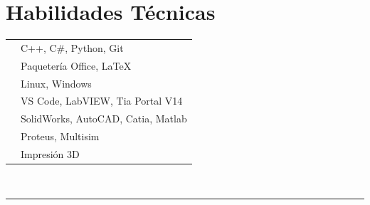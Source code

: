 \documentclass[oneside]{article}
\begin{document}
{\begin{minipage}[t][\textheight-2\fboxsep-2\fboxrule][t]{\dimexpr0.40\textwidth-2\fboxrule-2\fboxsep\relax}
        \section*{\large Habilidades Técnicas}
        \begin{tabularx}{\textwidth}{cY}
            \faCode{}        & C++, C\#, Python, Git\\
            \faFont{}        & Paquetería Office, \LaTeX\\
            \faDesktop{}     & Linux, Windows\\
            \faLaptopCode{}  & VS Code, LabVIEW, Tia Portal V14\\
            \faCogs{}        & SolidWorks, AutoCAD, Catia, Matlab\\
            \faBolt{}        & Proteus, Multisim\\
            \faToolbox{}     & Impresión 3D
        \end{tabularx}
        \vspace{1pt} \\
        \rule{\linewidth}{0.4pt}
    \end{minipage}
}
\hfill
\end{document}
